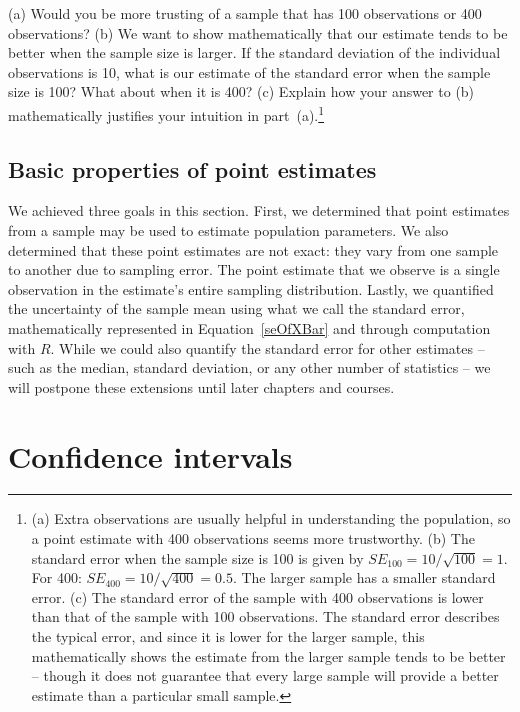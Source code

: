 \begin{exercise}
(a) Would you be more trusting of a sample that has 100 observations or 400 observations? (b) We want to show mathematically that our estimate tends to be better when the sample size is larger. If the standard deviation of the individual observations is 10, what is our estimate of the standard error when the sample size is 100? What about when it is 400? (c) Explain how your answer to (b) mathematically justifies your intuition in part~(a).\footnote{(a) Extra observations are usually helpful in understanding the population, so a point estimate with 400 observations seems more trustworthy. (b) The standard error when the sample size is 100 is given by $SE_{100} = 10/\sqrt{100} = 1$. For 400: $SE_{400} = 10/\sqrt{400} = 0.5$. The larger sample has a smaller standard error. (c) The standard error of the sample with 400 observations is lower than that of the sample with 100 observations. The standard error describes the typical error, and since it is lower for the larger sample, this mathematically shows the estimate from the larger sample tends to be better -- though it does not guarantee that every large sample will provide a better estimate than a particular small sample.}
\end{exercise}

\subsection{Basic properties of point estimates}

We achieved three goals in this section. First, we determined that point estimates from a sample may be used to estimate population parameters. We also determined that these point estimates are not exact: they vary from one sample to another due to sampling error. The point estimate that we observe is a single observation in the estimate's entire sampling distribution. Lastly, we quantified the uncertainty of the sample mean using what we call the standard error, mathematically represented in Equation~\eqref{seOfXBar} and through computation with $R$. While we could also quantify the standard error for other estimates -- such as the median, standard deviation, or any other number of statistics -- we will postpone these extensions until later chapters and courses.


\section{Confidence intervals}
\label{confidenceIntervals}

